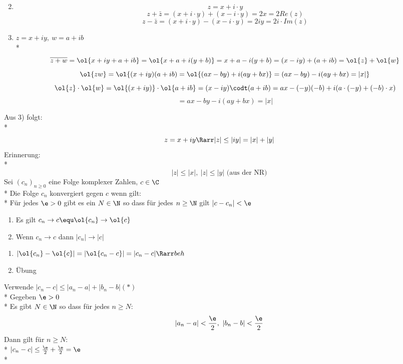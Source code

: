 \bew
\begin{enumerate}
\setcounter{enumi}{1}
\item{$$z=x+i·y$$
$$z+\bar{z}=(x+i·y)+(x-i·y)=2x=2Re(z)$$
$$z-\bar{z}=(x+i·y)-(x-i·y)=2iy=2i·Im(z)$$}
\setcounter{enumi}{1}
\item{$z = x+iy,\ w = a + ib$\\*
$$\overline{z+w} = \ol{x+iy + a + ib} = \ol{x+a + i(y+b)} = x + a - i(y + b) = (x - iy)+(a + ib) = \ol{z} + \ol{w}$$
$$\ol{zw} = \ol{(x+iy)(a + ib) = \ol{(ax - by) + i(ay + bx)} = (ax - by) - i(ay + bx) = |x|}$$
$$\ol{z} \cdot \ol{w} = \ol{(x+iy)} \cdot \ol{a+ib} = (x-iy) \codt (a+ib) = ax - (-y)(-b) + i(a\cdot (-y) + (-b) \cdot x)$$
$$= ax - by -i(ay + bx) =  |x|$$}
\end{enumerate}

\bem
Aus 3) folgt: \\*
$$z = x+iy \Rarr |z| \leq |iy| = |x| + |y|$$
Erinnerung:\\*
$$|z| \leq |x|,\ |z| \leq |y| \text{ (aus der NR)}$$
Sei $(c_n)_{n\geq 0}$ eine Folge komplexer Zahlen, $c \in \C$\\*
Die Folge $c_n$ konvergiert gegen $c$ wenn gilt:\\*
Für jedes $\e > 0$ gibt es ein $N \in \N$ so dass für jedes $n \geq \N$ gilt $|c - c_n| < \e$


\bem
\begin{enumerate}
\item{Es gilt $c_n \to c \equ \ol{c_n} \to \ol{c}$}
\item{Wenn $c_n \to c$ dann $|c_n| \to |c|$}
\end{enumerate}
\bew
\begin{enumerate}
\item{$|\ol{c_n} - \ol{c}| = |\ol{c_n - c}| = |c_n - c| \Rarr beh$}
\item{Übung}
\end{enumerate}


\item[$",\Larr"'$]{Verwende $|c_n - c| \leq |a_n - a| + |b_n - b| (*)$\\*
Gegeben $\e > 0$\\*
Es gibt $N \in \N$ so dass für jedes $n \geq N$:\\
$$|a_n - a| < \frac{\e}{2}, \ |b_n - b| < \frac{\e}{2}$$
Dann gilt für $n \geq N$:\\*
$|c_n - c| \leq \frac{\e}{2} + \frac{\e}{2} = \e$\\*}

